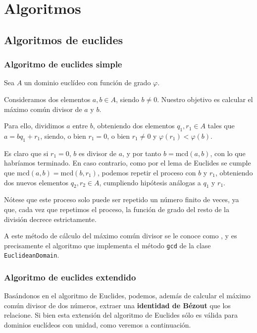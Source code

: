 \documentclass[a4paper, 11pt, twoside, notitlepage, openany, onecolumn, final]{report}
\title{\tb{Álgebra Computacional}}
\author{
	Álvaro García Tenorio
	\and
	Miguel Pascual Domínguez
}
\date{\today}
\begin{document}
	\maketitle
	\begin{abstract}
	\end{abstract}
	\tableofcontents
	\chapter{Algoritmos}
	\section{Algoritmos de euclides}
	\subsection{Algoritmo de euclides simple}
	Sea $A$ un dominio euclídeo con función de grado $\varphi$.
	
	Consideramos dos elementos $a,b\in A$, siendo $b\not=0$. Nuestro objetivo es calcular el máximo común divisor de $a$ y $b$.
	
	Para ello, dividimos $a$ entre $b$, obteniendo dos elementos $q_1,r_1\in A$ tales que $a=bq_1+r_1$, siendo, o bien $r_1=0$, o bien $r_1\not=0$ y $\varphi(r_1)<\varphi(b)$.
	
	Es claro que si $r_1=0$, $b$ es divisor de $a$, y por tanto $b=\text{mcd}(a,b)$, con lo que habríamos terminado. En caso contrario, como por el lema de Euclides se cumple que $\text{mcd}(a,b)=\text{mcd}(b,r_1)$, podemos repetir el proceso con $b$ y $r_1$, obteniendo dos nuevos elementos $q_2,r_2\in A$, cumpliendo hipótesis análogas a $q_1$ y $r_1$.
	
	Nótese que este proceso solo puede ser repetido un número finito de veces, ya que, cada vez que repetimos el proceso, la función de grado del resto de la división decrece estrictamente.
	
	A este método de cálculo del máximo común divisor se le conoce como , y es precisamente el algoritmo que implementa el método \texttt{gcd} de la clase \texttt{EuclideanDomain}.
	\subsection{Algoritmo de euclides extendido}
	Basándonos en el algoritmo de Euclides, podemos, además de calcular el máximo común divisor de dos números, extraer una \textbf{identidad de Bézout} que los relacione. Si bien esta extensión del algoritmo de Euclides sólo es válida para dominios euclídeos con unidad, como veremos a continuación.
	
\end{document}
